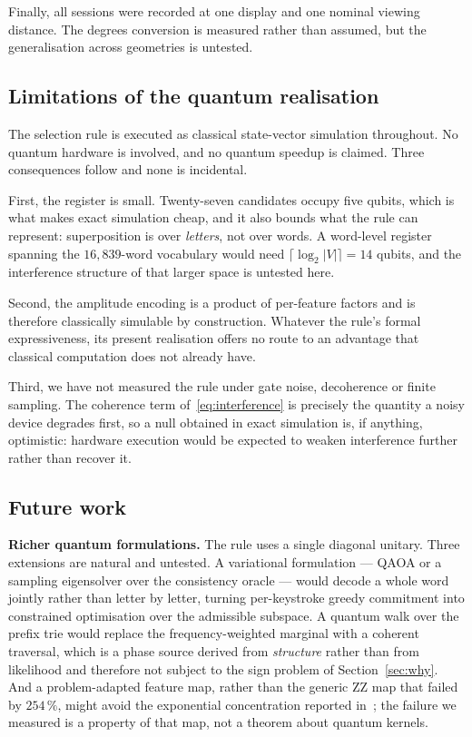 \documentclass[conference]{IEEEtran}
\begin{document}
Finally, all sessions were recorded at one display and one nominal viewing
distance. The degrees conversion is measured rather than assumed, but the
generalisation across geometries is untested.

\subsection{Limitations of the quantum realisation}

The selection rule is executed as classical state-vector simulation throughout.
No quantum hardware is involved, and no quantum speedup is claimed. Three
consequences follow and none is incidental.

First, the register is small. Twenty-seven candidates occupy five qubits, which
is what makes exact simulation cheap, and it also bounds what the rule can
represent: superposition is over \emph{letters}, not over words. A word-level
register spanning the $16{,}839$-word vocabulary would need $\lceil \log_2 |V|
\rceil = 14$ qubits, and the interference structure of that larger space is
untested here.

Second, the amplitude encoding is a product of per-feature factors and is
therefore classically simulable by construction. Whatever the rule's formal
expressiveness, its present realisation offers no route to an advantage that
classical computation does not already have.

Third, we have not measured the rule under gate noise, decoherence or finite
sampling. The coherence term of~\eqref{eq:interference} is precisely the
quantity a noisy device degrades first, so a null obtained in exact simulation
is, if anything, optimistic: hardware execution would be expected to weaken
interference further rather than recover it.

\subsection{Future work}

\textbf{Richer quantum formulations.} The rule uses a single diagonal unitary.
Three extensions are natural and untested. A variational formulation --- QAOA or
a sampling eigensolver over the consistency oracle --- would decode a whole word
jointly rather than letter by letter, turning per-keystroke greedy commitment
into constrained optimisation over the admissible subspace. A quantum walk over
the prefix trie would replace the frequency-weighted marginal with a coherent
traversal, which is a phase source derived from \emph{structure} rather than from
likelihood and therefore not subject to the sign problem of
Section~\ref{sec:why}. And a problem-adapted feature map, rather than the generic
ZZ map that failed by $254\,\%$, might avoid the exponential concentration
reported in~\cite{ref16}; the failure we measured is a property of that map, not
a theorem about quantum kernels.
\end{document}
